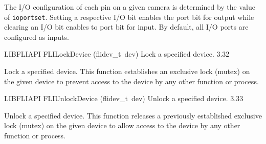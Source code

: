 \documentclass{article}
\begin{document}
\begin{cxxentry}
\begin{cxxfunction}
\begin{cxxdoc}
The I/O configuration of each pin on a given camera is determined by the
value of \texttt{ioportset}.  Setting a respective I/O bit enables the
port bit for output while clearing an I/O bit enables to port bit for
input. By default, all I/O ports are configured as inputs.


\end{cxxdoc}
\end{cxxfunction}
\begin{cxxfunction}
{LIBFLIAPI}
        {FLILockDevice}
        {(flidev\_t\ dev)}
        { Lock a specified device.}
        {3.32}
\begin{cxxdoc}

Lock a specified device.  This function establishes an exclusive
lock (mutex) on the given device to prevent access to the device by
any other function or process.


\end{cxxdoc}
\end{cxxfunction}
\begin{cxxfunction}
{LIBFLIAPI}
        {FLIUnlockDevice}
        {(flidev\_t\ dev)}
        { Unlock a specified device.}
        {3.33}
\begin{cxxdoc}

Unlock a specified device.  This function releases a previously
established exclusive lock (mutex) on the given device to allow
access to the device by any other function or process.



\end{cxxdoc}
\end{cxxfunction}
\end{cxxentry}
\end{document}
